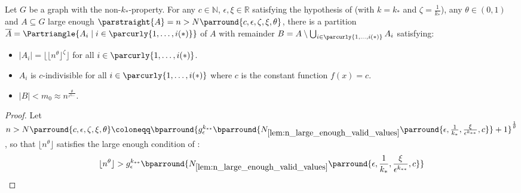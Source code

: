 
    \begin{theorem}[Theorem 4.23] \label{thm:equitative_partition_high_regularity_parts_grow_with_n}
        Let $G$ be a graph with the non-$k_*$-property.
        For any $c \in \mathbb{N}$, $\epsilon, \xi \in \mathbb{R}$ satisfying the hypothesis of 
        (with $k = k_*$ and $\zeta = \frac{1}{k_*}$), any $\theta \in (0,1)$ and $A \subseteq G$ large enough
        $\parstraight{A} = n > N\parround{c, \epsilon, \zeta, \xi, \theta}$,
        there is a partition $\overline{A} = \Partriangle{A_i \mid i \in \parcurly{1, \dots, i(*)}}$ of $A$ with remainder
        $B = A \setminus \bigcup_{i \in \parcurly{1, \dots, i(*)}} A_i$ satisfying:
        \begin{itemize}
            \item $|A_i| = \lfloor \lfloor n^\theta \rfloor ^\zeta \rfloor$ for all $i \in \parcurly{1, \dots, i(*)}$.
            \item $A_i$ is $c$-indivisible for all $i \in \parcurly{1, \dots, i(*)}$ where $c$ is the constant function $f(x) = c$.
            \item $|B| < m_0 \approx n^{\frac{\theta}{\epsilon^{k_{**}}}}$. 
        \end{itemize}
        \begin{proof}
            Let $n > N\parround{c, \epsilon, \zeta, \xi, \theta} \coloneqq \bparround{g_\epsilon^{k_{**}}\bparround{N_{\ref{lem:n_large_enough_valid_values}}
                \parround{ \epsilon, \frac{1}{k_*}, \frac{\xi}{\epsilon^{k_{**}}}, c}} + 1 }^{\frac{1}{\theta}}$,
            so that $\lfloor n^\theta \rfloor$ satisfies the large enough condition of
            :
            \[
                \lfloor n^\theta \rfloor
                    > g_\epsilon^{k_{**}}\bparround{N_{\ref{lem:n_large_enough_valid_values}}
                        \parround{\epsilon, \frac{1}{k_*}, \frac{\xi}{\epsilon^{k_{**}}}, c}}
\]
\end{proof}
\end{theorem}
